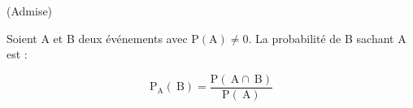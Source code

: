 \documentclass[12pt]{article}
\theoremstyle{break}
\begin{document}
\begin{proposition}{(Admise)}{}~\label{prop:formule_cond}
\begin{multihide}
Soient A et B deux événements avec $\mathrm{P}(\mathrm{A}) \neq 0$.
La probabilité de B sachant A est :

$$
\mathrm{P}_{\mathrm{A}}(\mathrm{~B})=\frac{\mathrm{P}(\mathrm{~A} \cap \mathrm{~B})}{\mathrm{P}(\mathrm{~A})}
$$
\end{multihide}
\end{proposition}
\end{document}
